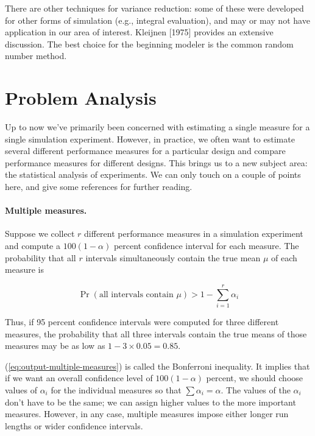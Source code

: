 There are other techniques for variance reduction: some of these were
developed for other forms of simulation (e.g., integral evaluation), and may
or may not have application in our area of interest. Kleijnen [1975] provides
an extensive discussion. The best choice for the beginning modeler is the
common random number method.

\section{Problem Analysis}
\label{sec:problem-analysis}

Up to now we've primarily been concerned with estimating a single measure for
a single simulation experiment. However, in practice, we often want to
estimate several different performance measures for a particular design and
compare performance measures for different designs. This brings us to a new
subject area: the statistical analysis of experiments. We can only touch on a
couple of points here, and give some references for further reading.

\paragraph{Multiple measures.}
Suppose we collect $r$ different performance measures in a simulation
experiment and compute a $100(1-\alpha)$ percent confidence interval for each
measure. The probability that all $r$ intervals simultaneously contain the
true mean $\mu$ of each measure is

\begin{equation}
\Pr(\text{all intervals contain } \mu) > 1 - \sum_{i=1}^{r} \alpha_i
\label{eq:output-multiple-measures}
\end{equation}

Thus, if 95 percent confidence intervals were computed for three different
measures, the probability that all three intervals contain the true means of
those measures may be as low as $1 - 3 \times 0.05 = 0.85$.

(\ref{eq:output-multiple-measures}) is called the Bonferroni inequality. It
implies that if we want an overall confidence level of $100(1-\alpha)$ percent,
we should choose values of $\alpha_i$ for the individual measures so that
$\sum \alpha_i = \alpha$. The values of the $\alpha_i$ don't have to be the same;
we can assign higher values to the more important measures. However, in any
case, multiple measures impose either longer run lengths or wider confidence
intervals.

